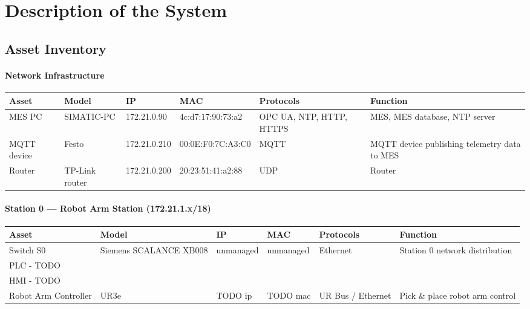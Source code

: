 \section{Description of the System}

\subsection{Asset Inventory}
{\scriptsize
\setlength{\tabcolsep}{3pt}

\paragraph{Network Infrastructure}
\begin{longtable}{L{2cm} L{2.1cm} L{2.1cm} L{2.6cm} L{2.4cm} L{4cm}}
\toprule
\textbf{Asset} & \textbf{Model} & \textbf{IP} & \textbf{MAC} & \textbf{Protocols} & \textbf{Function} \\
\midrule \endhead
    MES PC & SIMATIC-PC & 172.21.0.90 & 4c:d7:17:90:73:a2 & OPC
    UA, NTP, HTTP, HTTPS & MES, MES database, NTP server \\

    MQTT device & Festo & 172.21.0.210 & 00:0E:F0:7C:A3:C0 &
    MQTT & MQTT device publishing telemetry data to MES \\

    Router & TP-Link router & 172.21.0.200 &
    20:23:51:41:a2:88 & UDP & Router \\
\bottomrule
\end{longtable}

\paragraph{Station 0 --- Robot Arm Station (172.21.1.x/18)}
\begin{longtable}{L{2cm} L{2.1cm} L{2.1cm} L{2.6cm} L{2.4cm} L{4cm}}
\toprule
\textbf{Asset} & \textbf{Model} & \textbf{IP} & \textbf{MAC} & \textbf{Protocols} & \textbf{Function} \\
\midrule \endhead
    Switch S0 & Siemens SCALANCE XB008 & unmanaged & unmanaged &
    Ethernet & Station 0 network distribution \\

    PLC  - TODO\\

    HMI  - TODO\\

    Robot Arm Controller & UR3e & TODO ip & TODO mac & UR Bus / Ethernet & Pick \& place robot arm control \\ 


\end{longtable}}
